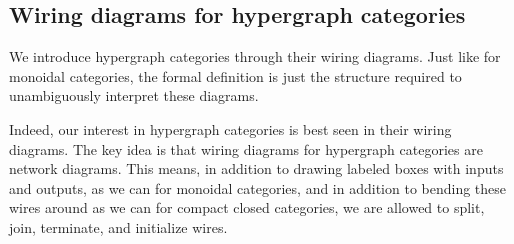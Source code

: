 \documentclass[7Sketches]{subfiles}
\begin{document}
\subsection{Wiring diagrams for hypergraph categories}%

We introduce hypergraph categories through their wiring diagrams. Just like for
monoidal categories, the formal definition is just the structure required to
unambiguously interpret these diagrams.

Indeed, our interest in hypergraph categories is best seen in their wiring
diagrams. The key idea is that wiring diagrams for hypergraph categories are
network diagrams. This means, in addition to drawing labeled boxes with inputs
and outputs, as we can for monoidal categories, and in addition to bending these
wires around as we can for compact closed categories, we are allowed to split,
join, terminate, and initialize wires.%
\end{document}

